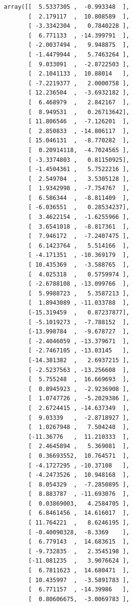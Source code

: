 \documentclass[11pt]{article}
\makeatletter
\newcommand{\boxspacing}{\kern\kvtcb@left@rule\kern\kvtcb@boxsep}
\newcommand{\prompt}[4]{
        {\ttfamily\llap{{\color{#2}[#3]:\hspace{3pt}#4}}\vspace{-\baselineskip}}
    }
\makeatother
\begin{document}
            \begin{tcolorbox}[breakable, size=fbox, boxrule=.5pt, pad at break*=1mm, opacityfill=0]
\prompt{Out}{outcolor}{7}{\boxspacing}
\begin{Verbatim}[commandchars=\\\{\}]
array([[  5.5337305 ,  -0.993348  ],
       [  2.179117  ,  10.808589  ],
       [ -3.3342304 ,   0.7840228 ],
       [  6.771133  , -14.399791  ],
       [ -2.0037494 ,   9.948875  ],
       [ -1.4479944 ,   5.7463264 ],
       [  9.033091  ,  -2.8722503 ],
       [  2.1041133 ,  10.88014   ],
       [ -7.2219377 ,   2.0000758 ],
       [ 12.236504  ,  -3.6932182 ],
       [  6.468979  ,   2.842167  ],
       [  8.949531  ,   0.26713642],
       [ 11.806546  ,  -7.126201  ],
       [  2.850833  , -14.806117  ],
       [ 15.046131  ,  -8.770282  ],
       [  0.20914118,  -4.7024565 ],
       [ -3.3374803 ,   0.81150925],
       [ -1.4504361 ,   5.7522216 ],
       [  2.549704  ,   3.5305128 ],
       [  1.9342998 ,  -7.754767  ],
       [  6.586344  ,  -8.811409  ],
       [ -6.036551  ,   0.28534237],
       [  3.4622154 ,  -1.6255966 ],
       [  3.6541018 ,  -8.817361  ],
       [  7.946172  ,  -7.2407475 ],
       [  6.1423764 ,   5.514166  ],
       [ -4.171351  , -10.369179  ],
       [ 10.435369  ,  -3.588765  ],
       [  4.025318  ,   0.5759974 ],
       [ -2.6788108 , -13.099766  ],
       [  5.9988723 ,   5.3587213 ],
       [  1.8943089 , -11.033788  ],
       [-15.319459  ,   0.87237877],
       [ -5.1019273 ,  -7.788152  ],
       [-13.998784  ,  -9.678727  ],
       [ -2.4046059 , -13.379671  ],
       [ -2.7467105 , -13.03145   ],
       [-14.381382  ,   2.6937215 ],
       [ -2.5237563 , -13.256608  ],
       [  5.755248  ,  16.669693  ],
       [  0.8945923 ,  -2.9236908 ],
       [  1.0747726 ,  -5.2029386 ],
       [  2.6724415 , -14.637349  ],
       [  9.03339   ,  -2.8718927 ],
       [  1.0267948 ,   7.504248  ],
       [-11.36776   ,  11.210333  ],
       [  2.4645894 ,   5.369081  ],
       [  0.36693552,  10.764571  ],
       [ -4.1727295 , -10.37108   ],
       [ -4.2473526 ,  10.948168  ],
       [  8.054329  ,  -7.2850895 ],
       [  8.883787  , -11.693076  ],
       [  0.03869003,   4.2584705 ],
       [  6.8461456 ,  14.616017  ],
       [ 11.764221  ,   8.6246195 ],
       [ -0.40090328,  -8.3369    ],
       [  6.779143  ,  14.683615  ],
       [ -9.732835  ,   2.3545198 ],
       [-11.081235  ,   3.9076624 ],
       [  6.7811623 ,  14.680471  ],
       [ 10.435997  ,  -3.5891783 ],
       [  6.771157  , -14.39986   ],
       [  0.80606675,  -3.0069783 ],

\end{Verbatim}
\end{tcolorbox}
\end{document}
